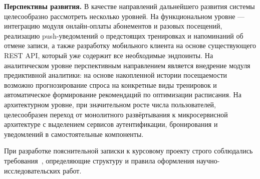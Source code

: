 \textbf{Перспективы развития.} В качестве направлений дальнейшего развития
системы целесообразно рассмотреть несколько уровней. На функциональном
уровне --- интеграцию модуля онлайн-оплаты абонементов и разовых посещений,
реализацию push-уведомлений о предстоящих тренировках и напоминаний
об отмене записи, а также разработку мобильного клиента на основе
существующего REST API, который уже содержит все необходимые эндпоинты.
На аналитическом уровне перспективным направлением является внедрение
модуля предиктивной аналитики: на основе накопленной истории посещаемости
возможно прогнозирование спроса на конкретные виды тренировок и
автоматическое формирование рекомендаций по оптимизации расписания.
На архитектурном уровне, при значительном росте числа пользователей,
целесообразен переход от монолитного развёртывания к микросервисной
архитектуре с выделением сервисов аутентификации, бронирования и
уведомлений в самостоятельные компоненты.

При разработке пояснительной записки к курсовому проекту строго соблюдались
требования~\cite{gost_report}, определяющие структуру и правила оформления
научно-исследовательских работ.